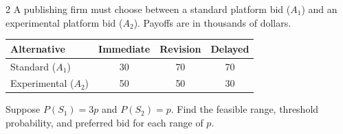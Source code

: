 \begin{multicols}{2}
		A publishing firm must choose between a standard platform bid ($A_1$) and an experimental platform bid ($A_2$). Payoffs are in thousands of dollars.\vspace{-3mm}
		\begin{center}\setlength{\tabcolsep}{2pt}\renewcommand{\arraystretch}{1.1}
			\begin{tabular}{lccc}\toprule
				Alternative&Immediate&Revision&Delayed\\ \midrule
				Standard ($A_1$)&30&70&70\\
				Experimental ($A_2$)&50&50&30\\ \bottomrule
			\end{tabular}
		\end{center}\vspace{-3mm}
		Suppose $P(S_1)=3p$ and $P(S_2)=p$. Find the feasible range, threshold probability, and preferred bid for each range of $p$.

	\end{multicols}


